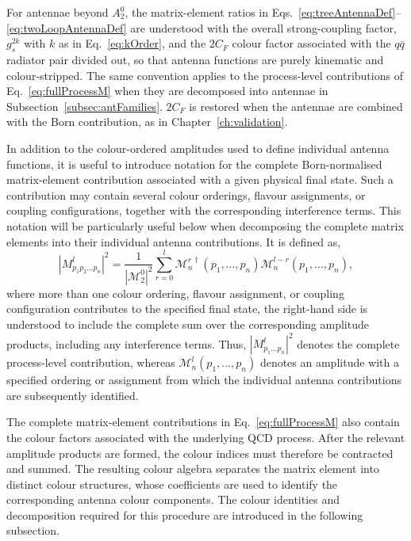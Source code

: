 For antennae beyond $A_2^0$, the matrix-element ratios in
Eqs.~\eqref{eq:treeAntennaDef}--\eqref{eq:twoLoopAntennaDef} are understood with the overall
strong-coupling factor, $g_s^{2k}$ with $k$ as in Eq.~\eqref{eq:kOrder}, and the $2C_F$ colour factor
associated with the $q\bar q$ radiator pair divided out, so that antenna functions are purely
kinematic and colour-stripped. The same convention applies to the process-level contributions of
Eq.~\eqref{eq:fullProcessM} when they are decomposed into antennae in
Subsection~\ref{subsec:antFamilies}. $2C_F$ is restored when the antennae are combined with the
Born contribution, as in Chapter~\ref{ch:validation}.

In addition to the colour-ordered amplitudes used to define individual antenna
functions, it is useful to introduce notation for the complete Born-normalised
matrix-element contribution associated with a given physical final state. Such
a contribution may contain several colour orderings, flavour assignments, or
coupling configurations, together with the corresponding interference terms.
This notation will be particularly useful below when decomposing the complete
matrix elements into their individual antenna contributions. It is defined as,
\begin{equation}\label{eq:fullProcessM}
    |M_{p_1p_2...p_n}^l|^2 = \frac{1}{|\mathcal M_2^0|^2}\sum_{r=0}^l\mathcal M_n^{r\,\dagger}(p_1,...,p_n)\mathcal M_n^{l-r}(p_1,...,p_n),
\end{equation}
where more than one colour ordering, flavour assignment, or coupling
configuration contributes to the specified final state, the right-hand side is
understood to include the complete sum over the corresponding amplitude
products, including any interference terms.
Thus, $|M_{p_1\ldots p_n}^l|^2$ denotes the complete process-level
contribution, whereas $\mathcal M_n^l(p_1,\ldots,p_n)$ denotes an amplitude
with a specified ordering or assignment from which the individual antenna
contributions are subsequently identified.

The complete matrix-element contributions in Eq.~\eqref{eq:fullProcessM} also
contain the colour factors associated with the underlying QCD process. After
the relevant amplitude products are formed, the colour indices must therefore
be contracted and summed. The resulting colour algebra separates the matrix
element into distinct colour structures, whose coefficients are used to
identify the corresponding antenna colour components. The colour identities
and decomposition required for this procedure are introduced in the following
subsection.

